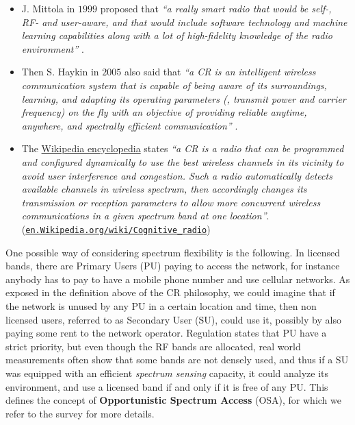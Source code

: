 \begin{itemize}\tightlist
    \item
    J. Mittola in $1999$ proposed that
    \emph{``a really smart radio that would be self-, RF- and user-aware, and that would include software technology and machine learning capabilities along with a lot of high-fidelity knowledge of the radio environment''} \cite{Mitola99}.

    \item
    Then S. Haykin in $2005$ also said that
    \emph{``a CR is an intelligent wireless communication system that is capable of being aware of its surroundings, learning, and adapting its operating parameters (\eg, transmit power and carrier frequency) on the fly with an objective of providing reliable anytime, anywhere, and spectrally efficient communication''} \cite{Haykin05}.

    \item
    The \href{https://en.wikipedia.org/wiki/Cognitive_radio}{Wikipedia encyclopedia} states
    \emph{``a CR is a radio that can be programmed and configured dynamically to use the best wireless channels in its vicinity to avoid user interference and congestion. Such a radio automatically detects available channels in wireless spectrum, then accordingly changes its transmission or reception parameters to allow more concurrent wireless communications in a given spectrum band at one location''}.
    (\href{https://en.wikipedia.org/wiki/Cognitive_radio}{\texttt{en.Wikipedia.org/wiki/Cognitive\_radio}})
\end{itemize}


One possible way of considering spectrum flexibility is the following.
%
In licensed bands, there are Primary Users (PU) paying to access the network, for instance anybody has to pay to have a mobile phone number and use cellular networks.
As exposed in the definition above of the CR philosophy, we could imagine that if the network is unused by any PU in a certain location and time, then non licensed users, referred to as Secondary User (SU), could use it, possibly by also paying some rent to the network operator.
%
Regulation states that PU have a strict priority,
but even though the RF bands are allocated, real world measurements often show that some bands are not densely used, and thus if a SU was equipped with an efficient \emph{spectrum sensing} capacity, it could analyze its environment, and use a licensed band if and only if it is free of any PU.
This defines the concept of \textbf{Opportunistic Spectrum Access} (OSA), for which we refer to the survey \cite{Zhao07} for more details.



